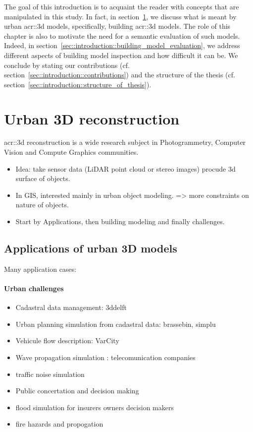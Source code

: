 \minitoc

The goal of this introduction is to acquaint the reader with concepts that are manipulated in this study.
In fact, in section~\ref{sec::introduction::urban_3d_reconstruction}, we discuss what is meant by urban \gls{acr::3d} models, specifically,  building \gls{acr::3d} models.
The role of this chapter is also to motivate the need for a semantic evaluation of such models.
Indeed, in section~\ref{sec::introduction::building_model_evaluation}, we address different aspects of building model inspection and how difficult it can be.
We conclude by stating our contributions (cf. section~\ref{sec::introduction::contributions}) and the structure of the thesis (cf. section~\ref{sec::introduction::structure_of_thesis}).

\section{Urban 3D reconstruction}
    \label{sec::introduction::urban_3d_reconstruction}
    \gls{acr::3d} reconstruction is a wide research subject in Photogrammetry, Computer Vision and Compute Graphics communities.
    \begin{itemize}
        \item Idea: take sensor data (LiDAR point cloud or stereo images) procude 3d surface of objects.
        \item In GIS, interested mainly in urban object modeling. => more constraints on nature of objects.
        \item Start by Applications, then building modeling and finally challenges.
    \end{itemize} 
    \subsection{Applications of urban 3D models}
        Many application cases:
        \paragraph{Urban challenges}
        \begin{itemize}
            \item Cadastral data management: 3ddelft
            \item Urban planning simulation from cadastral data: brassebin, simplu
            \item Vehicule flow description: VarCity
            \item Wave propagation simulation : telecomunication companies
            \item traffic noise simulation
            \item Public concertation and decision making
            \item flood simulation for insurers owners decision makers
            \item fire hazards and propogation
        \end{itemize}
